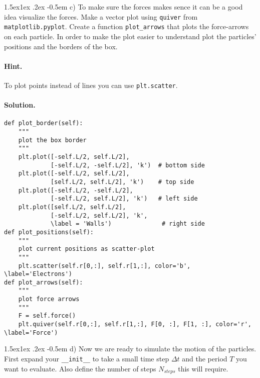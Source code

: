 \documentclass[%
oneside,                 %
final,                   %
10pt]{article}
\makeatletter
\newenvironment{doconceexercise}{}{}
\newcommand\subex{\@startsection{paragraph}{4}{\z@}%
                  {1.5ex\@plus1ex \@minus.2ex}%
                  {-0.5em}%
                  {\normalfont\normalsize\bfseries}}
\makeatother
\begin{document}
\begin{doconceexercise}

\subex{c)}
To make sure the forces makes sence it can be a good idea visualize the forces. Make a vector plot using \texttt{quiver} from \texttt{matplotlib.pyplot}. Create a function \texttt{plot\_arrows} that plots the force-arrows on each particle. In order to make the plot easier to understand plot the particles' positions and the borders of the box.


\paragraph{Hint.}
To plot points instead of lines you can use \texttt{plt.scatter}.



\paragraph{Solution.}
\begin{verbatim}
def plot_border(self):
    """
    plot the box border
    """
    plt.plot([-self.L/2, self.L/2],
             [-self.L/2, -self.L/2], 'k')  # bottom side
    plt.plot([-self.L/2, self.L/2],
             [self.L/2, self.L/2], 'k')    # top side
    plt.plot([-self.L/2, -self.L/2],
             [-self.L/2, self.L/2], 'k')   # left side
    plt.plot([self.L/2, self.L/2],
             [-self.L/2, self.L/2], 'k',
             \label = 'Walls')              # right side
def plot_positions(self):
    """
    plot current positions as scatter-plot
    """
    plt.scatter(self.r[0,:], self.r[1,:], color='b', \label='Electrons')
def plot_arrows(self):
    """
    plot force arrows
    """
    F = self.force()
    plt.quiver(self.r[0,:], self.r[1,:], F[0, :], F[1, :], color='r', \label='Force')
\end{verbatim}


\subex{d)}
Now we are ready to simulate the motion of the particles. First expand your \texttt{\_\_init\_\_} to take a small time step $\Delta t$ and the period $T$ you want to evaluate. Also define the number of steps $N_{steps}$ this will require.



\end{doconceexercise}
\end{document}
